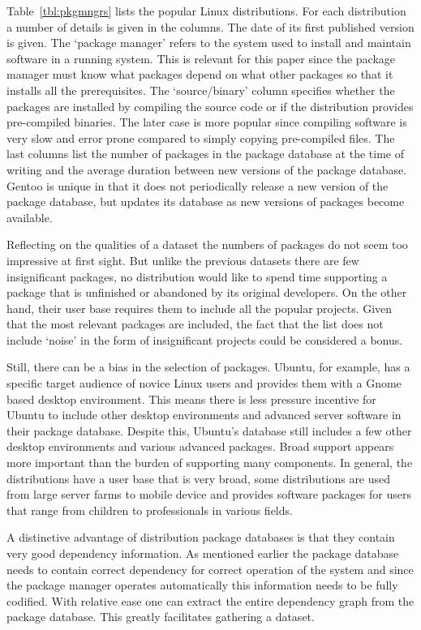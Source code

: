 \documentclass[smallextended,final]{svjour3}
\begin{document}
Table~\ref{tbl:pkgmngrs} lists the popular Linux distributions. For each distribution a number of details is given in the columns. The date of its first published version is given. The `package manager' refers to the system used to install and maintain software in a running system. This is relevant for this paper since the package manager must know what packages depend on what other packages so that it installs all the prerequisites. The `source/binary' column specifies whether the packages are installed by compiling the source code or if the distribution provides pre-compiled binaries. The later case is more popular since compiling software is very slow and error prone compared to simply copying pre-compiled files. The last columns list the number of packages in the package database at the time of writing and the average duration between new versions of the package database. Gentoo is unique in that it does not periodically release a new version of the package database, but updates its database as new versions of packages become available.

Reflecting on the qualities of a dataset the numbers of packages do not seem too impressive at first sight. But unlike the previous datasets there are few insignificant packages, no distribution would like to spend time supporting a package that is unfinished or abandoned by its original developers. On the other hand, their user base requires them to include all the popular projects. Given that the most relevant packages are included, the fact that the list does not include `noise' in the form of insignificant projects could be considered a bonus.

Still, there can be a bias in the selection of packages. Ubuntu, for example, has a specific target audience of novice Linux users and provides them with a Gnome based desktop environment. This means there is less pressure incentive for Ubuntu to include other desktop environments and advanced server software in their package database. Despite this, Ubuntu's database still includes a few other desktop environments and various advanced packages. Broad support appears more important than the burden of supporting many components. In general, the distributions have a user base that is very broad, some distributions are used from large server farms to mobile device and provides software packages for users that range from children to professionals in various fields.

A distinctive advantage of distribution package databases is that they contain very good dependency information. As mentioned earlier the package database needs to contain correct dependency for correct operation of the system and since the package manager operates automatically this information needs to be fully codified. With relative ease one can extract the entire dependency graph from the package database. This greatly facilitates gathering a dataset.
\end{document}
